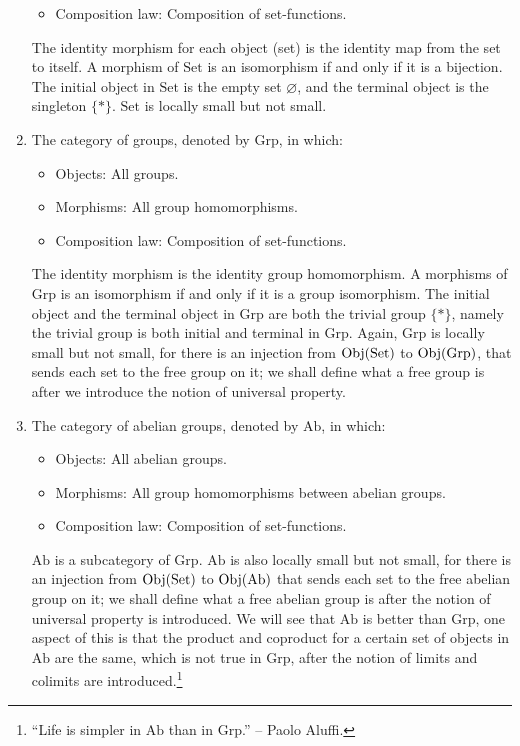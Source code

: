 \begin{example}
\begin{enumerate}[label=(\roman*)]
\begin{itemize}
			\item Composition law: Composition of set-functions.
		\end{itemize}
	The identity morphism for each object (set) is the identity map from the set to itself. A morphism of $\mathrm{Set}$ is an isomorphism if and only if it is a bijection. The initial object in $\mathrm{Set}$ is the empty set $\varnothing$, and the terminal object is the singleton $\{*\}$. $\mathrm{Set}$ is locally small but not small.
	\item The category of groups, denoted by $\mathrm{Grp}$, in which:
		\begin{itemize}
			\item Objects: All groups.
			\item Morphisms: All group homomorphisms.
			\item Composition law: Composition of set-functions.
		\end{itemize}
	The identity morphism is the identity group homomorphism. A morphisms of $\mathrm{Grp}$ is an isomorphism if and only if it is a group isomorphism. The initial object and the terminal object in $\mathrm{Grp}$ are both the trivial group $\{*\}$, namely the trivial group is both initial and terminal in $\mathrm{Grp}$. Again, $\mathrm{Grp}$ is locally small but not small, for there is an injection from $\operatorname{Obj}(\mathrm{Set})$ to $\operatorname{Obj}(\mathrm{Grp})$, that sends each set to the free group on it; we shall define what a free group is after we introduce the notion of universal property.
\newpage
	\item The category of abelian groups, denoted by $\mathrm{Ab}$, in which:
		\begin{itemize}
			\item Objects: All abelian groups.
			\item Morphisms: All group homomorphisms between abelian groups.
			\item Composition law: Composition of set-functions.
		\end{itemize}
	$\mathrm{Ab}$ is a subcategory of $\mathrm{Grp}$. $\mathrm{Ab}$ is also locally small but not small, for there is an injection from $\operatorname{Obj}(\mathrm{Set})$ to $\operatorname{Obj}(\mathrm{Ab})$ that sends each set to the free abelian group on it; we shall define what a free abelian group is after the notion of universal property is introduced. We will see that $\mathrm{Ab}$ is better than $\mathrm{Grp}$, one aspect of this is that the product and coproduct for a certain set of objects in $\mathrm{Ab}$ are the same, which is not true in $\mathrm{Grp}$, after the notion of limits and colimits are introduced.\footnote{``Life is simpler in $\mathrm{Ab}$ than in $\mathrm{Grp}$.'' -- Paolo Aluffi.}

\end{enumerate}
\end{example}

